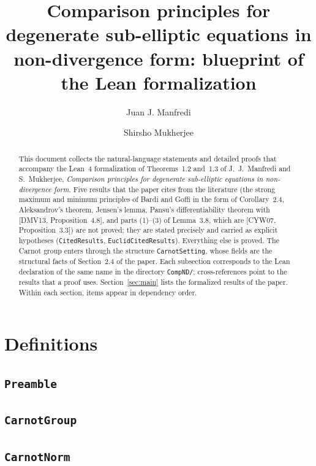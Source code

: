 \documentclass[11pt]{amsart}
\title[Blueprint of the Lean formalization]{Comparison principles for degenerate sub-elliptic equations in non-divergence form: blueprint of the Lean formalization}
\author{Juan J. Manfredi}
\author{Shirsho Mukherjee}
\theoremstyle{definition}
\begin{document}
\begin{abstract}
This document collects the natural-language statements and detailed proofs that accompany the Lean~4 formalization of Theorems~1.2 and~1.3 of J.~J.~Manfredi and S.~Mukherjee, \emph{Comparison principles for degenerate sub-elliptic equations in non-divergence form}.
Five results that the paper cites from the literature (the strong maximum and minimum principles of Bardi and Goffi in the form of Corollary~2.4, Aleksandrov's theorem, Jensen's lemma, Pansu's differentiability theorem with [DMV13, Proposition~4.8], and parts (1)--(3) of Lemma~3.8, which are [CYW07, Proposition~3.3]) are not proved; they are stated precisely and carried as explicit hypotheses (\texttt{CitedResults}, \texttt{EuclidCitedResults}). Everything else is proved.
The Carnot group enters through the structure \texttt{CarnotSetting}, whose fields are the structural facts of Section~2.4 of the paper.
Each subsection corresponds to the Lean declaration of the same name in the directory \texttt{CompND/}; cross-references point to the results that a proof uses.
Section~\ref{sec:main} lists the formalized results of the paper.
Within each section, items appear in dependency order.
\end{abstract}
\maketitle
\tableofcontents

\section{Definitions}
\subsection{\texorpdfstring{\texttt{Preamble}}{Preamble}}\label{node:Preamble}


\subsection{\texorpdfstring{\texttt{CarnotGroup}}{CarnotGroup}}\label{node:CarnotGroup}


\subsection{\texorpdfstring{\texttt{CarnotNorm}}{CarnotNorm}}\label{node:CarnotNorm}

\end{document}
